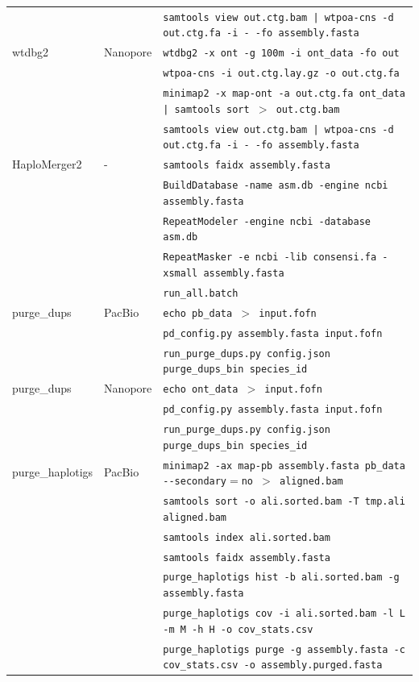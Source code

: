 \begin{suppsection}
\begin{table}[ht]
{\begin{tabular}{lll}
    & & \texttt{samtools view out.ctg.bam | wtpoa-cns -d out.ctg.fa -i - -fo assembly.fasta} \\
wtdbg2 & Nanopore & \texttt{wtdbg2 -x ont -g 100m -i ont\_data -fo out} \\
    & & \texttt{wtpoa-cns -i out.ctg.lay.gz -o out.ctg.fa} \\
    & & \texttt{minimap2 -x map-ont -a out.ctg.fa ont\_data | samtools sort $>$ out.ctg.bam} \\
    & & \texttt{samtools view out.ctg.bam | wtpoa-cns -d out.ctg.fa -i - -fo assembly.fasta} \\
HaploMerger2 & - & \texttt{samtools faidx assembly.fasta} \\
 &  & \texttt{BuildDatabase -name asm.db -engine ncbi assembly.fasta} \\
 &  & \texttt{RepeatModeler -engine ncbi -database asm.db} \\
  &  & \texttt{RepeatMasker -e ncbi -lib consensi.fa -xsmall assembly.fasta} \\
  &  & \texttt{run\_all.batch} \\
purge\_dups & PacBio & \texttt{echo pb\_data $>$ input.fofn} \\ 
 &  & \texttt{pd\_config.py assembly.fasta input.fofn} \\ 
 &  & \texttt{run\_purge\_dups.py config.json purge\_dups\_bin species\_id} \\ 
purge\_dups & Nanopore & \texttt{echo ont\_data $>$ input.fofn} \\ 
 &  & \texttt{pd\_config.py assembly.fasta input.fofn} \\ 
 &  & \texttt{run\_purge\_dups.py config.json purge\_dups\_bin species\_id} \\ 
purge\_haplotigs & PacBio & \texttt{minimap2 -ax map-pb assembly.fasta pb\_data -{}-secondary$=$no $>$ aligned.bam} \\
    & & \texttt{samtools sort -o ali.sorted.bam -T tmp.ali aligned.bam} \\
    & & \texttt{samtools index ali.sorted.bam} \\
    & & \texttt{samtools faidx assembly.fasta} \\
    & & \texttt{purge\_haplotigs hist -b ali.sorted.bam -g assembly.fasta} \\
    & & \texttt{purge\_haplotigs cov -i ali.sorted.bam -l L -m M -h H -o cov\_stats.csv}\\
    & & \texttt{purge\_haplotigs purge -g assembly.fasta -c cov\_stats.csv -o assembly.purged.fasta}\\

\end{tabular}}
\end{table}
\end{suppsection}
